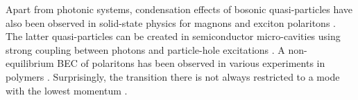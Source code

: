 \documentclass[12pt, a4paper]{iopart}
\begin{document}
Apart from photonic systems, condensation effects of bosonic quasi-particles have also been observed in solid-state physics for magnons \cite{Magnons,Magnon-BEC-coherence,Magnon-BEC-pumping,Magnon-BEC-dipolar,Magnon-BEC-supercurrent} and exciton polaritons \cite{Kasprzak-BEC_of_polaritions,Malpuech-polarition_laser_thermo_vs_quantum_kinetic,Butov-polariton_laser,Kasprzak-Formation_excition_polarition_condensate,Byrnes_exciton-polarition-condensates,Ostrovskaya}. The latter quasi-particles  can be created in semiconductor micro-cavities  using strong coupling between photons and particle-hole excitations \cite{Kasprzak-BEC_of_polaritions}. A non-equilibrium BEC of polaritons has been observed in various experiments in polymers \cite{Plumhof-BEC_Polarition_Polymer_rommetemp,Stoeferle-exciton_bec_polymer}. Surprisingly, the transition there is not always restricted to a mode with the lowest momentum \cite{Richard-coherent_pt_of_polaritions}.
\end{document}
